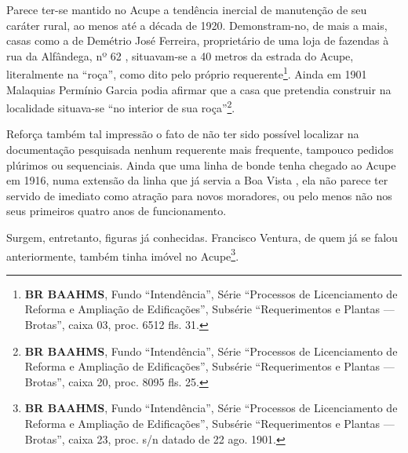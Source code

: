 
Parece ter-se mantido no Acupe a tendência inercial de manutenção de seu caráter rural, ao menos até a década de 1920. Demonstram-no, de mais a mais, casas como a de Demétrio José Ferreira, proprietário de uma loja de fazendas à rua da Alfândega, nº 62 \cite[p.~423]{reis_almanak_1898}, situavam-se a 40 metros da estrada do Acupe, literalmente na ``roça'', como dito pelo próprio requerente\footnote{\textbf{BR BAAHMS}, Fundo ``Intendência'', Série ``Processos de Licenciamento de Reforma e Ampliação de Edificações'', Subsérie ``Requerimentos e Plantas --- Brotas'', caixa 03, proc. 6512 fls. 31.}. Ainda em 1901 Malaquias Permínio Garcia podia afirmar que a casa que pretendia construir na localidade situava-se ``no interior de sua roça''\footnote{\textbf{BR BAAHMS}, Fundo ``Intendência'', Série ``Processos de Licenciamento de Reforma e Ampliação de Edificações'', Subsérie ``Requerimentos e Plantas --- Brotas'', caixa 20, proc. 8095 fls. 25.}. 
 





Reforça também tal impressão o fato de não ter sido possível localizar na documentação pesquisada nenhum requerente mais frequente, tampouco pedidos plúrimos ou sequenciais. Ainda que uma linha de bonde tenha chegado ao Acupe em 1916, numa extensão da linha que já servia a Boa Vista \cite[p.~384]{stiel_historia_1984}, ela não parece ter servido de imediato como atração para novos moradores, ou pelo menos não nos seus primeiros quatro anos de funcionamento.

Surgem, entretanto, figuras já conhecidas. Francisco Ventura, de quem já se falou anteriormente, também tinha imóvel no Acupe\footnote{\textbf{BR BAAHMS}, Fundo ``Intendência'', Série ``Processos de Licenciamento de Reforma e Ampliação de Edificações'', Subsérie ``Requerimentos e Plantas --- Brotas'', caixa 23, proc. s/n datado de 22 ago. 1901.}. 

